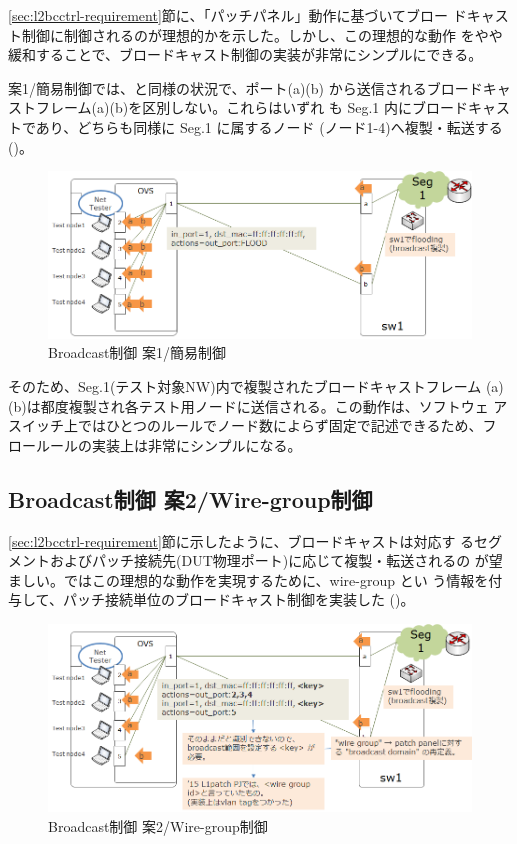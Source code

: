 \ref{sec:l2bcctrl-requirement}節に、「パッチパネル」動作に基づいてブロー
ドキャスト制御に制御されるのが理想的かを示した。しかし、この理想的な動作
をやや緩和することで、ブロードキャスト制御の実装が非常にシンプルにできる。

案1/簡易制御では、と同様の状況で、ポート(a)(b)
から送信されるブロードキャストフレーム(a)(b)を区別しない。これらはいずれ
も Seg.1 内にブロードキャストであり、どちらも同様に Seg.1 に属するノード
(ノード1-4)へ複製・転送する()。

\begin{figure}[h]
 \centering
 \includegraphics[scale=0.6]{img/l2bcctrl_plan1_design.png}
 \caption{Broadcast制御 案1/簡易制御}
 \label{fig:l2bcctrl_plan1_design}
\end{figure}

そのため、Seg.1(テスト対象NW)内で複製されたブロードキャストフレーム
(a)(b)は都度複製され各テスト用ノードに送信される。この動作は、ソフトウェ
アスイッチ上ではひとつのルールでノード数によらず固定で記述できるため、フ
ロールールの実装上は非常にシンプルになる。

  \subsection{Broadcast制御 案2/Wire-group制御}
  \label{sec:l2bcctrl-plan2}

\ref{sec:l2bcctrl-requirement}節に示したように、ブロードキャストは対応す
るセグメントおよびパッチ接続先(DUT物理ポート)に応じて複製・転送されるの
が望ましい。\lopjc ではこの理想的な動作を実現するために、wire-group とい
う情報を付与して、パッチ接続単位のブロードキャスト制御を実装した
()。

\begin{figure}[h]
 \centering
 \includegraphics[scale=0.6]{img/l2bcctrl_plan2_design.png}
 \caption{Broadcast制御 案2/Wire-group制御}
 \label{fig:l2bcctrl_plan2_design}
\end{figure}

